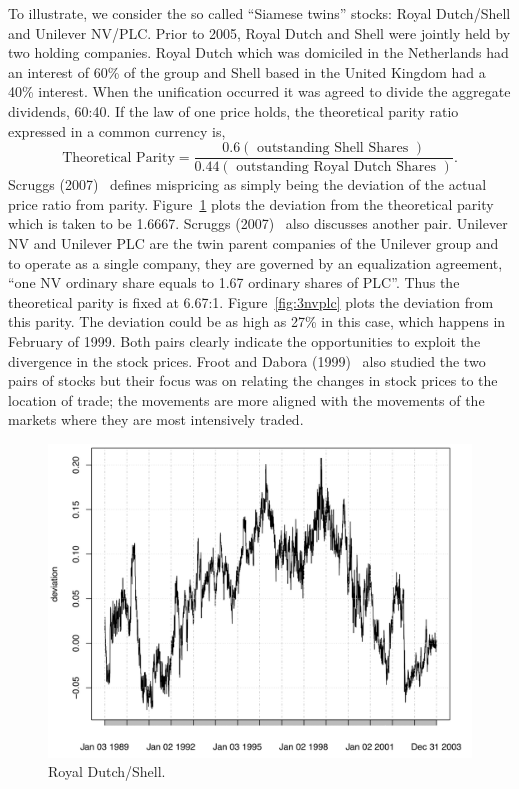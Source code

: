 To illustrate, we consider the so called ``Siamese twins'' stocks: Royal Dutch/Shell and Unilever NV/PLC. Prior to 2005, Royal Dutch and Shell were jointly held by two holding companies. Royal Dutch which was domiciled in the Netherlands had an interest of 60\% of the group and Shell based in the United Kingdom had a 40\% interest. When the unification occurred it was agreed to divide the aggregate dividends, 60:40. If the law of one price holds, the theoretical parity ratio expressed in a common currency is,
	\[
	\text{Theoretical Parity}= \frac{0.6 (\text{ outstanding Shell Shares })}{0.44 (\text{ outstanding Royal Dutch Shares })}.
	\]
Scruggs (2007)~\cite{scruggs} defines mispricing as simply being the deviation of the actual price ratio from parity. Figure~\ref{fig:3royal} plots the deviation from the theoretical parity which is taken to be 1.6667. Scruggs (2007)~\cite{scruggs} also discusses another pair. Unilever NV and Unilever PLC are the twin parent companies of the Unilever group and to operate as a single company, they are governed by an equalization agreement, ``one NV ordinary share equals to 1.67 ordinary shares of PLC''. Thus the theoretical parity is fixed at 6.67:1. Figure~\ref{fig:3nvplc} plots the deviation from this parity. The deviation could be as high as 27\% in this case, which happens in February of 1999. Both pairs clearly indicate the opportunities to exploit the divergence in the stock prices. Froot and Dabora (1999)~\cite{froot1999stock} also studied the two pairs of stocks but their focus was on relating the changes in stock prices to the location of trade; the movements are more aligned with the movements of the markets where they are most intensively traded.

	\begin{figure}[!ht]
	\centering
	\includegraphics[width=\textwidth]{chapters/chapter_stat_ts/figures/471.png}
	\caption{Royal Dutch/Shell. \label{fig:3royal}}
	\end{figure}
	
